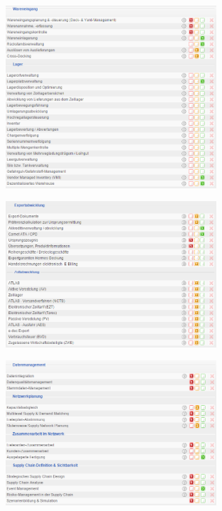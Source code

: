 \documentclass[12pt]{article}
\begin{document}
\begin{figure}[!h]
\centering
\includegraphics[width=0.7\textwidth]{images/tr24}
\end{figure}\FloatBarrier
\noindent
\begin{figure}[!h]
\centering
\includegraphics[width=0.7\textwidth]{images/tr25}
\end{figure}\FloatBarrier
\noindent
\begin{figure}[!h]
\centering
\includegraphics[width=0.7\textwidth]{images/tr26}
\end{figure}\FloatBarrier
\end{document}
